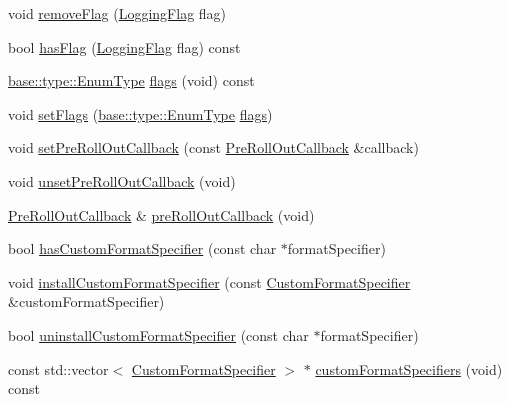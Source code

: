 \begin{DoxyCompactItemize}
void \hyperlink{classel_1_1base_1_1_storage_aaecbb6ae954d0bf748ac7f3c980a9173}{remove\+Flag} (\hyperlink{namespaceel_a2784aacd04cb7816ac1c0b20fcbf83cb}{Logging\+Flag} flag)
\item 
bool \hyperlink{classel_1_1base_1_1_storage_ab569cf6e09897b0520dee7f4d1fb742e}{has\+Flag} (\hyperlink{namespaceel_a2784aacd04cb7816ac1c0b20fcbf83cb}{Logging\+Flag} flag) const 
\item 
\hyperlink{namespaceel_1_1base_1_1type_afb892a99b7545bf6e45c1e1d84af2ec9}{base\+::type\+::\+Enum\+Type} \hyperlink{classel_1_1base_1_1_storage_a0a8da674f034011c50b0479307677855}{flags} (void) const 
\item 
void \hyperlink{classel_1_1base_1_1_storage_a5df88c56b8d923c20568e50ceb0bdd64}{set\+Flags} (\hyperlink{namespaceel_1_1base_1_1type_afb892a99b7545bf6e45c1e1d84af2ec9}{base\+::type\+::\+Enum\+Type} \hyperlink{classel_1_1base_1_1_storage_a0a8da674f034011c50b0479307677855}{flags})
\item 
void \hyperlink{classel_1_1base_1_1_storage_a626165bc5c8808b733707294ce2a0dc8}{set\+Pre\+Roll\+Out\+Callback} (const \hyperlink{namespaceel_aeb764b890a6f3cd41d2726bcd4e9c0cf}{Pre\+Roll\+Out\+Callback} \&callback)
\item 
void \hyperlink{classel_1_1base_1_1_storage_a2bfdc3a20eeafe158ee8603c805131e4}{unset\+Pre\+Roll\+Out\+Callback} (void)
\item 
\hyperlink{namespaceel_aeb764b890a6f3cd41d2726bcd4e9c0cf}{Pre\+Roll\+Out\+Callback} \& \hyperlink{classel_1_1base_1_1_storage_a90a3a886437746acae51cacbd5731572}{pre\+Roll\+Out\+Callback} (void)
\item 
bool \hyperlink{classel_1_1base_1_1_storage_ae953cb6e8acafa96c5c1ab2f4826a4a5}{has\+Custom\+Format\+Specifier} (const char $\ast$format\+Specifier)
\item 
void \hyperlink{classel_1_1base_1_1_storage_a355aac8191ab98869a52394cc868a315}{install\+Custom\+Format\+Specifier} (const \hyperlink{classel_1_1_custom_format_specifier}{Custom\+Format\+Specifier} \&custom\+Format\+Specifier)
\item 
bool \hyperlink{classel_1_1base_1_1_storage_a68e1d3e0b657418ddb0f62f60fe979d2}{uninstall\+Custom\+Format\+Specifier} (const char $\ast$format\+Specifier)
\item 
const std\+::vector$<$ \hyperlink{classel_1_1_custom_format_specifier}{Custom\+Format\+Specifier} $>$ $\ast$ \hyperlink{classel_1_1base_1_1_storage_aaafbc69cac920ec79f60e1cf4c2c12d6}{custom\+Format\+Specifiers} (void) const 
\item 

\end{DoxyCompactItemize}
